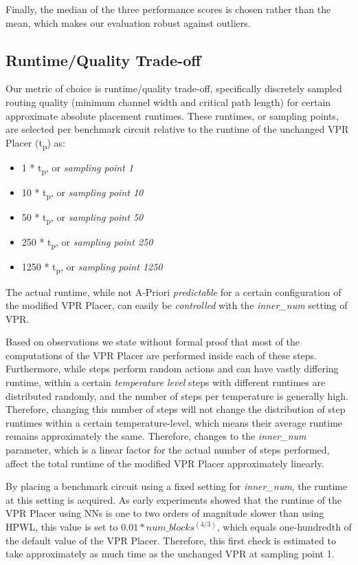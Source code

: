 Finally, the median of the three performance scores is chosen rather than the mean, which makes our evaluation robust against outliers.

\subsection{Runtime/Quality Trade-off}

Our metric of choice is runtime/quality trade-off, specifically discretely sampled routing quality (minimum channel width and critical path length) for certain approximate absolute placement runtimes. These runtimes, or sampling points, are selected per benchmark circuit relative to the runtime of the unchanged \gls{VPR} Placer (t\textsubscript{p}) as:

\begin{itemize}
	\item 1   * t\textsubscript{p}, or \textit{sampling point 1}
	\item 10  * t\textsubscript{p}, or \textit{sampling point 10}
	\item 50  * t\textsubscript{p}, or \textit{sampling point 50}
	\item 250 * t\textsubscript{p}, or \textit{sampling point 250}
	\item 1250 * t\textsubscript{p}, or \textit{sampling point 1250}
\end{itemize}

The actual runtime, while not A-Priori \textit{predictable} for a certain configuration of the modified \gls{VPR} Placer, can easily be \textit{controlled} with the \textit{inner\_num} setting of \gls{VPR}\cite{vtr8}. 

Based on observations we state without formal proof that most of the computations of the \gls{VPR} Placer are performed inside each of these steps. Furthermore, while steps perform random actions and can have vastly differing runtime, within a certain \textit{temperature level} steps with different runtimes are distributed randomly, and the number of steps per temperature is generally high. Therefore, changing this number of steps will not change the distribution of step runtimes within a certain temperature-level, which means their average runtime remains approximately the same. Therefore, changes to the \textit{inner\_num} parameter, which is a linear factor for the actual number of steps performed, affect the total runtime of the modified \gls{VPR} Placer approximately linearly.

By placing a benchmark circuit using a fixed setting for \textit{inner\_num}, the runtime at this setting is acquired. As early experiments showed that the runtime of the \gls{VPR} Placer using \glspl{NN} is one to two orders of magnitude slower than using \gls{HPWL}, this value is set to $0.01*num\_blocks^(4/3)$, which equals one-hundredth of the default value of the \gls{VPR} Placer. Therefore, this first check is estimated to take approximately as much time as the unchanged \gls{VPR} at sampling point 1.

